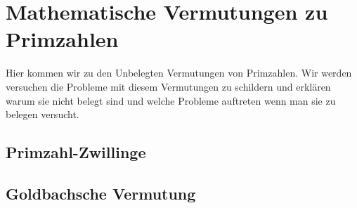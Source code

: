 \documentclass[11pt]{article}
\begin{document}
\section{Mathematische Vermutungen zu Primzahlen}
Hier kommen wir zu den Unbelegten Vermutungen von Primzahlen. Wir werden versuchen die Probleme mit diesem Vermutungen zu schildern und erklären warum sie nicht belegt sind und welche Probleme auftreten wenn man sie zu belegen versucht.
\subsection{Primzahl-Zwillinge}

\newpage
\subsection{Goldbachsche Vermutung}

\newpage
%
\end{document}
